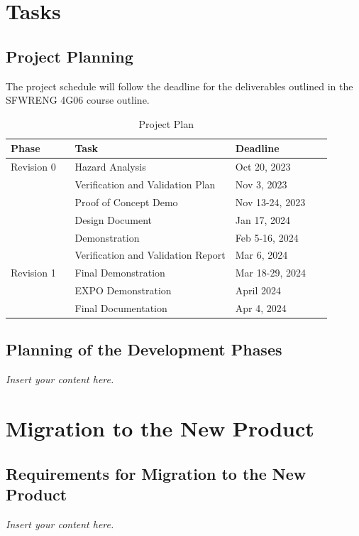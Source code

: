 \documentclass[12pt]{article}
\newcommand{\lips}{\textit{Insert your content here.}}
\begin{document}
\section{Tasks}
\subsection{Project Planning}

The project schedule will follow the deadline for the deliverables outlined in the SFWRENG
4G06 course outline.

\begin{table}[H]
    \centering
    \begin{tabular}{|p{0.2\linewidth} | p{0.5\linewidth}| p{0.3\linewidth} |}
    \hline
    \textbf{Phase} & \textbf{Task} & \textbf{Deadline}\\
    \hline
    Revision 0 & Hazard Analysis & Oct 20, 2023 \\
     \cline{2-3} & Verification and Validation Plan & Nov 3, 2023 \\
     \cline{2-3} & Proof of Concept Demo & Nov 13-24, 2023\\
     \cline{2-3} & Design Document & Jan 17, 2024\\
     \cline{2-3} & Demonstration & Feb 5-16, 2024\\
     \cline{2-3} & Verification and Validation Report & Mar 6, 2024\\
     \hline
     Revision 1 & Final Demonstration & Mar 18-29, 2024\\
     \cline{2-3} & EXPO Demonstration & April 2024\\
     \cline{2-3} & Final Documentation & Apr 4, 2024\\
     
     
     
     
     
    \hline
    \end{tabular}
    \caption{Project Plan}
    \label{TblProjectTasks}
\end{table}

\subsection{Planning of the Development Phases}
\lips

\section{Migration to the New Product}
\subsection{Requirements for Migration to the New Product}
\lips
\end{document}
